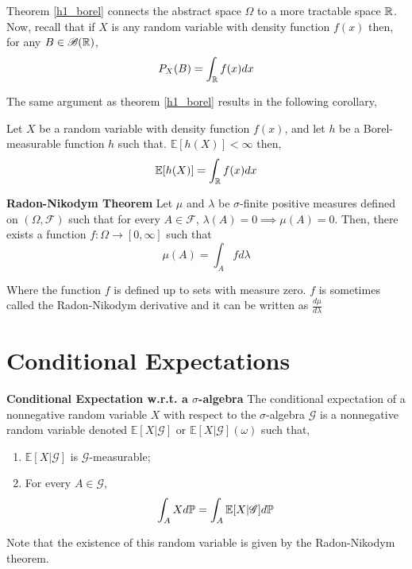\documentclass[../TGMAFFIRO.tex]{subfiles}
\begin{document}
Theorem \ref{h1_borel} connects the abstract space $\Omega$ to a more tractable space $\mathbb{R}$.\\

Now, recall that if $X$ is any random variable with density function $f(x)$ then, for any $B \in \mathscr{B}(\mathbb{R})$,
\begin{equation*}
	P_X(B) = \int_{\mathbb{R}} f(x) dx
\end{equation*}

The same argument as theorem \ref{h1_borel} results in the following corollary,
\begin{corollary}
	Let $X$ be a random variable with density function $f(x)$, and let $h$ be a Borel-measurable function $h$ such that. $\mathbb{E}[h(X)] < \infty$ then,
	\begin{equation}
		\mathbb{E}[h(X)] = \int_{\mathbb{R}} f(x) dx
	\end{equation}
\end{corollary}

\begin{theorem}\textbf{Radon-Nikodym Theorem}
Let $\mu$ and $\lambda$ be $\sigma$-finite positive measures defined on $(\Omega, \mathscr{F})$ such that for every $A \in \mathscr{F}$, $\lambda(A) = 0 \implies \mu(A)= 0$. Then, there exists a function $f: \Omega \to [0, \infty]$ such that
\[
	\mu(A) = \int_A f d\lambda
\]

Where the function $f$ is defined up to sets with measure zero. $f$ is sometimes called the Radon-Nikodym derivative and it can be written as $\frac{d\mu}{d\lambda}$
\end{theorem}

\section{Conditional Expectations}

\begin{definition}\textbf{Conditional Expectation w.r.t. a $\sigma$-algebra}
The conditional expectation of a nonnegative random variable $X$ with respect to the $\sigma$-algebra $\mathscr{G}$ is a nonnegative random variable denoted $\mathbb{E}[X | \mathscr{G}]$ or $\mathbb{E}[X | \mathscr{G}](\omega)$ such that,
\begin{enumerate}
	\item $\mathbb{E}[X | \mathscr{G}]$ is $\mathscr{G}$-measurable;
	\item For every $A \in \mathscr{G}$,
	\[\int_A X d\mathbb{P} = \int_A \mathbb{E}[X | \mathscr{G}] d\mathbb{P}\]
\end{enumerate}

\end{definition}
Note that the existence of this random variable is given by the Radon-Nikodym theorem.
\end{document}

